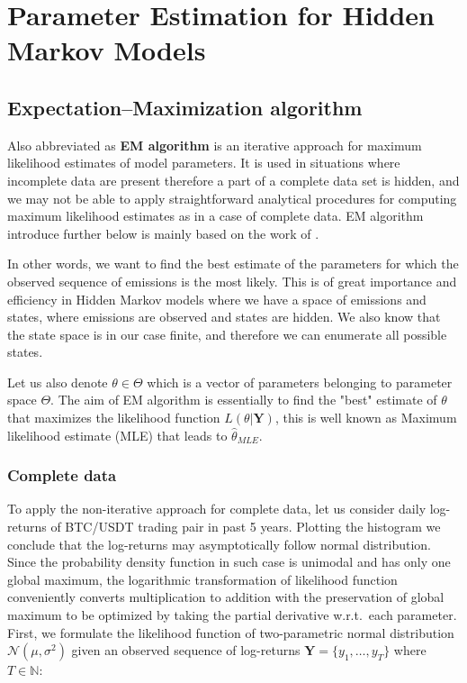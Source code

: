 
\chapter{Parameter Estimation for Hidden Markov Models}

\ifpdf
    \graphicspath{{Chapter2/Figs/Raster/}{Chapter2/Figs/PDF/}{Chapter2/Figs/}}
\else
    \graphicspath{{Chapter2/Figs/Vector/}{Chapter2/Figs/}}
\fi

\section{ Expectation–Maximization algorithm}

Also abbreviated as \textbf{EM algorithm} is an iterative approach for maximum likelihood estimates of model parameters. 
It is used in situations where incomplete data are present therefore a part of a complete data set is hidden, 
and we may not be able to apply straightforward analytical procedures for computing maximum likelihood estimates as in a 
case of complete data. EM algorithm introduce further below is mainly based on the work of \cite{Dempster1977}.

In other words, we want to find the best estimate of the parameters for which the observed sequence of emissions is the most likely. 
This is of great importance and efficiency in Hidden Markov models where we have a space of emissions and states, where  emissions 
are observed and states are hidden. We also know that the state space is in our case finite, and therefore we can enumerate all possible states.

Let us also denote $\theta \in \Theta$ which is a vector of parameters belonging to parameter space $\Theta$. 
The aim of EM algorithm is essentially to find the "best" estimate of $\theta$ that maximizes the likelihood function $L(\theta|\textbf{Y})$, 
this is well known as Maximum likelihood estimate (MLE) that leads to $\hat{\theta}_{MLE}$. 

\subsection*{Complete data}

To apply the non-iterative approach for complete data, let us consider daily log-returns of BTC/USDT trading pair in past 5 years. 
Plotting the histogram we conclude that the log-returns may asymptotically follow normal distribution. 
Since the probability density function in such case is unimodal and has only one global maximum, 
the logarithmic transformation of likelihood function conveniently converts multiplication to addition with the 
preservation of global maximum to be optimized by taking the partial derivative w.r.t.\ each parameter. 
First, we formulate the likelihood function of two-parametric normal distribution $\mathcal{N}(\mu,\sigma^2)$ given an observed sequence 
of log-returns $\textbf{Y} = \{y_1,\ldots,y_T\}$ where $T \in \mathbb{N}$:
 
